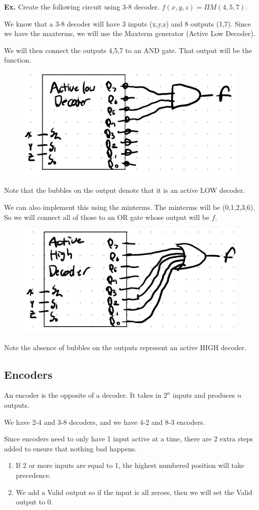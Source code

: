 \documentclass[12pt,letterpaper]{article} \usepackage{amsmath} \usepackage{graphicx}  \usepackage{longtable}  \usepackage{amssymb}
\begin{document}
        \begin{mdframed}
            \textbf{Ex. } Create the following circuit using 3-8 decoder. $f(x,y,z) = \Pi M(4,5,7)$.

            We know that a 3-8 decoder will have 3 inputs (x,y,z) and 8 outputs (1,7). Since we have the maxterms, we will use the Maxterm generator (Active Low Decoder).

            We will then connect the outputs 4,5,7 to an AND gate. That output will be the function. 
            \begin{figure}[H]
                \centering
                \includegraphics[width=0.4\linewidth]{ex5.png}
            \end{figure}
            Note that the bubbles on the output denote that it is an active LOW decoder. 

            We can also implement this using the minterms. The minterms will be (0,1,2,3,6). So we will connect all of those to an OR gate whose output will be $f$. 
            \begin{figure}[H]
                \centering
                \includegraphics[width=0.4\linewidth]{ex5-2.png}
            \end{figure}
            Note the absence of bubbles on the outputs represent an active HIGH decoder. 
        \end{mdframed}

        \subsection{Encoders}
        An encoder is the opposite of a decoder. It takes in $2^n$ inputs and produces $n$ outputs. 

        We have 2-4 and 3-8 decoders, and we have 4-2 and 8-3 encoders. 

        Since encoders need to only have 1 input active at a time, there are 2 extra steps added to ensure that nothing bad happens. 
        \begin{enumerate}
            \item If 2 or more inputs are equal to 1, the highest numbered position will take precedence. 
            \item We add a Valid output so if the input is all zeroes, then we will set the Valid output to 0.  
        \end{enumerate}
\end{document}
